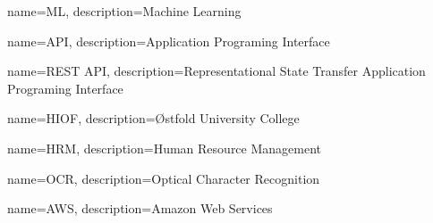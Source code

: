 \usepackage{glossaries}
\makeglossaries

 {
    name=ML,
    description={Machine Learning}
}

 {
    name=API,
    description={Application Programing Interface}
}

 {
    name=REST API,
    description={Representational State Transfer Application Programing Interface}
}

 {
    name=HIOF,
    description={Østfold University College}
}

 {
    name=HRM,
    description={Human Resource Management}
}

 {
    name=OCR,
    description={Optical Character Recognition}
}

 {
    name=AWS,
    description={Amazon Web Services}
}




